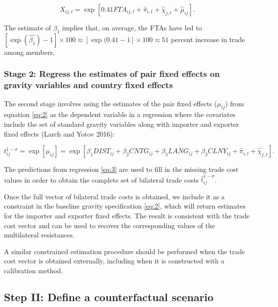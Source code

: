 \documentclass[10pt]{article}
\begin{document}
\begin{equation}
X_{ij,t} = \exp\left[0.41 FTA_{ij,t} + \hat{\pi}_{i,t} + \hat{\chi}_{j,t} + \hat{\mu}_{ij}\right].\label{eq:2}
\end{equation}

The estimate of \(\beta_1\) implies that, on average, the FTAs have led
to
\([\exp(\hat{\beta_1}) - 1] \times 100 \approx [\exp(0.41 - 1] \times 100 \approx 51\)
percent increase in trade among members.

\hypertarget{stage-2-regress-the-estimates-of-pair-fixed-effects-on-gravity-variables-and-country-fixed-effects}{%
\subsubsection{Stage 2: Regress the estimates of pair fixed effects on
gravity variables and country fixed
effects}\label{stage-2-regress-the-estimates-of-pair-fixed-effects-on-gravity-variables-and-country-fixed-effects}}

The second stage involves using the estimates of the pair fixed effects
(\(\mu_{ij}\)) from equation \eqref{eq:2} as the dependent variable in a
regression where the covariates include the set of standard gravity
variables along with importer and exporter fixed effects (Larch and
Yotov 2016):

\begin{equation}
t_{ij}^{1-\sigma} = \exp[\mu_{ij}] = \exp\left[\beta_1 DIST_{ij} + \beta_2 CNTG_{ij} + \beta_3 LANG_{ij} + \beta_3 CLNY_{ij} + \hat{\pi}_{i,t} + \hat{\chi}_{j,t}\right]. \label{eq:3}
\end{equation}

The predictions from regression \eqref{eq:3} are used to fill in the
missing trade cost values in order to obtain the complete set of
bilateral trade costs \(\hat{t}_{ij}^{1-\sigma}\).

Once the full vector of bilateral trade costs is obtained, we include it
as a constraint in the baseline gravity specification \eqref{eq:2},
which will return estimates for the importer and exporter fixed effects.
The result is consistent with the trade cost vector and can be used to
recover the corresponding values of the multilateral resistances.

A similar constrained estimation procedure should be performed when the
trade cost vector is obtained externally, including when it is
constructed with a calibration method.

\hypertarget{step-ii-define-a-counterfactual-scenario}{%
\subsection{Step II: Define a counterfactual
scenario}\label{step-ii-define-a-counterfactual-scenario}}
\end{document}
